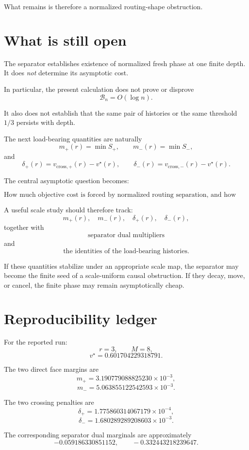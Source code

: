 \documentclass[11pt,a4paper]{article}
\newcommand{\opt}{v^\star}
\begin{document}
What remains is therefore a normalized routing-shape obstruction.

\section{What is still open}

The separator establishes existence of normalized fresh phase at one finite
depth.  It does \emph{not} determine its asymptotic cost.

In particular, the present calculation does not prove or disprove
\[
\mathcal B_n=O(\log n).
\]

It also does not establish that the same pair of histories or the same
threshold \(1/3\) persists with depth.

The next load-bearing quantities are naturally
\[
m_+(r)
=
\min S_+,
\qquad
m_-(r)
=
\min S_-,
\]
and
\[
\delta_+(r)
=
v_{\mathrm{cross},+}(r)-v^\star(r),
\qquad
\delta_-(r)
=
v_{\mathrm{cross},-}(r)-v^\star(r).
\]

The central asymptotic question becomes:

\[
\boxed{
\text{How much objective cost is forced by normalized routing separation,
and how does that cost evolve with depth?}
}
\]

A useful scale study should therefore track:
\[
m_+(r),\quad
m_-(r),\quad
\delta_+(r),\quad
\delta_-(r),
\]
together with
\[
\text{separator dual multipliers}
\]
and
\[
\text{the identities of the load-bearing histories.}
\]

If these quantities stabilize under an appropriate scale map, the separator
may become the finite seed of a scale-uniform causal obstruction.
If they decay, move, or cancel, the finite phase may remain asymptotically
cheap.

\section{Reproducibility ledger}

For the reported run:
\[
r=3,\qquad M=8,
\]
\[
\opt=0.601704229318791.
\]

The two direct face margins are
\[
m_+
=
3.190779088825230\times10^{-3},
\]
\[
m_-
=
5.063855122542593\times10^{-3}.
\]

The two crossing penalties are
\[
\delta_+
=
1.775860314067179\times10^{-4},
\]
\[
\delta_-
=
1.680289289208603\times10^{-3}.
\]

The corresponding separator dual marginals are approximately
\[
-0.059186330851152,
\qquad
-0.332443218239647.
\]
\end{document}
